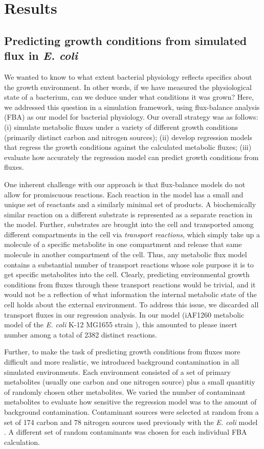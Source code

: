 \documentclass[12pt]{article}
\begin{document}
\section*{Results}
\subsection*{Predicting growth conditions from simulated flux in \emph{E. coli}}

We wanted to know to what extent bacterial physiology reflects specifics about the growth environment. In other words, if we have measured the physiological state of a bacterium, can we deduce under what conditions it was grown? Here, we addressed this question in a simulation framework, using flux-balance analysis (FBA) as our model for bacterial physiology. Our overall strategy was as follows: (i) simulate metabolic fluxes under a variety of different growth conditions (primarily distinct carbon and nitrogen sources); (ii) develop regression models that regress the growth conditions against the calculated metabolic fluxes; (iii) evaluate how accurately the regression model can predict growth conditions from fluxes.

One inherent challenge with our approach is that flux-balance models do not allow for promiscuous reactions. Each reaction in the model has a small and unique set of reactants and a similarly minimal set of products. A biochemically similar reaction on a different substrate is represented as a separate reaction in the model. Further, substrates are brought into the cell and transported among different compartments in the cell via \emph{transport reactions}, which simply take up a molecule of a specific metabolite in one compartment and release that same molecule in another compartment of the cell. Thus, any metabolic flux model contains a substantial number of transport reactions whose sole purpose it is to get specific metabolites into the cell. Clearly, predicting environmental growth conditions from fluxes through these transport reactions would be trivial, and it would not be a reflection of what information the internal metabolic state of the cell holds about the external environment. To address this issue, we discarded all transport fluxes in our regression analysis. In our model (iAF1260 metabolic model of the \emph{E. coli} K-12 MG1655 strain \cite{Schellenbergeretal2010}), this amounted to {\color{red}please insert number} among a total of 2382 distinct reactions.

Further, to make the task of predicting growth conditions from fluxes more difficult and more realistic, we introduced background contamination in all simulated environments. Each environment consisted of a set of primary metabolites (usually one carbon and one nitrogen source) plus a small quantitiy of randomly chosen other metabolites. We varied the number of contaminant metabolites to evaluate how sensitive the regression model was to the amount of background contamination. Contaminant sources were selected at random from a set of 174 carbon and 78 nitrogen sources used previously with the \emph{E. coli} model \cite{Feistetal2007}. A different set of random contaminants was chosen for each individual FBA calculation.
\end{document}
